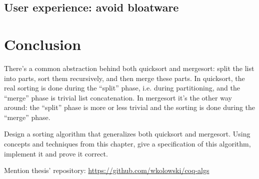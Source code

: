 \documentclass[declaration,mgr,english,shortabstract]{iithesis}
\newcommand{\repo}{\url{https://github.com/wkolowski/coq-algs}}
\begin{document}
\section{User experience: avoid bloatware} \label{bloatware}

\chapter{Conclusion} \label{conclusion}

There's a common abstraction behind both quicksort and mergesort: split the list into parts, sort them recursively, and then merge these parts. In quicksort, the real sorting is done during the ``split'' phase, i.e. during partitioning, and the ``merge'' phase is trivial list concatenation. In mergesort it's the other way around: the ``split'' phase is more or less trivial and the sorting is done during the ``merge'' phase.

Design a sorting algorithm that generalizes both quicksort and mergesort. Using concepts and techniques from this chapter, give a specification of this algorithm, implement it and prove it correct.

Mention thesis' repository: \repo

\end{document}
